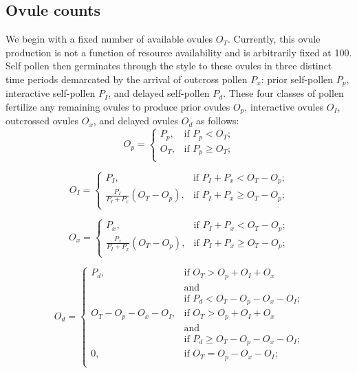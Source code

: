 \documentclass[12pt]{amsart}
\begin{document}
\subsection{Ovule counts}
We begin with a fixed number of available ovules $O_{T}$. Currently, this ovule production is not a function of resource availability and is arbitrarily fixed at 100. Self pollen then germinates through the style to these ovules in three distinct time periods demarcated by the arrival of outcross pollen $P_{x}$: prior self-pollen $P_{p}$, interactive self-pollen $P_{I}$, and delayed self-pollen $P_{d}$. These four classes of pollen fertilize any remaining ovules to produce prior ovules $O_{p}$, interactive ovules $O_{I}$, outcrossed ovules $O_{x}$, and delayed ovules $O_{d}$ as follows:
\begin{equation} \label{eq:priorOvules}
	O_{p}=
	\begin{cases}
		P_{p}, 	&\text{if $P_{p} < O_{T}$;}\\
		O_{T},	&\text{if $P_{p} \geqslant O_{T}$;}\\
	\end{cases}
\end{equation}

\begin{equation} \label{eq:interactiveOvules}
	O_{I}=
	\begin{cases}
		P_{I}, 									&\text{if $P_{I} + P_{x} < O_{T} - O_{p}$;}\\
		\frac{P_{I}}{P_{I} + P_{x}} \left( O_{T} - O_{p}\right),	&\text{if $P_{I} + P_{x} \geqslant O_{T} - O_{p}$;}\\
	\end{cases}
\end{equation}

\begin{equation} \label{eq:outcrossOvules}
	O_{x}=
	\begin{cases}
		P_{x}, 									&\text{if $P_{I} + P_{x} < O_{T} - O_{p}$;}\\
		\frac{P_{x}}{P_{I} + P_{x}} \left( O_{T} - O_{p}\right),	&\text{if $P_{I} + P_{x} \geqslant O_{T} - O_{p}$;}\\
	\end{cases}
\end{equation}

\begin{equation} \label{eq:delayedOvules}
	O_{d}=
	\begin{cases}
		P_{d}, 					&\text{if $O_{T} > O_{p} + O_{I} + O_{x}$}\\
								&\text{and}\\
								&\text{if $P_{d} < O_{T}-O_{p}-O_{x}-O_{I}$;}\\
		O_{T}-O_{p}-O_{x}-O_{I},	&\text{if $O_{T} > O_{p} + O_{I} + O_{x}$}\\
								&\text{and}\\
								&\text{if $P_{d} \geqslant O_{T}-O_{p}-O_{x}-O_{I}$;}\\
		0,						&\text{if $O_{T}=O_{p}-O_{x}-O_{I}$;}\\
	\end{cases}
\end{equation}
\end{document}
